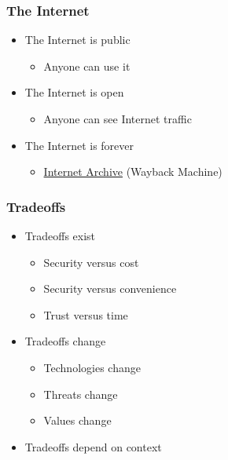 \documentclass[blue]{beamer}
\begin{document}
\begin{frame}
\frametitle{The Internet}

\begin{itemize}
  \item The Internet is public
  \begin{itemize}
    \item Anyone can use it
  \end{itemize}
  \item The Internet is open
  \begin{itemize}
    \item Anyone can see Internet traffic
  \end{itemize}
  \item The Internet is forever
  \begin{itemize}
    \item \href{https://archive.org/}{Internet Archive} (Wayback Machine)
  \end{itemize}
\end{itemize}

\end{frame}



\begin{frame}
\frametitle{Tradeoffs}

\begin{itemize}
  \item Tradeoffs exist
  \begin{itemize}
    \item Security versus cost
    \item Security versus convenience
    \item Trust versus time
  \end{itemize}
  \item Tradeoffs change
  \begin{itemize}
    \item Technologies change
    \item Threats change
    \item Values change
  \end{itemize}
  \item Tradeoffs depend on context
\end{itemize}

\end{frame}
\end{document}
